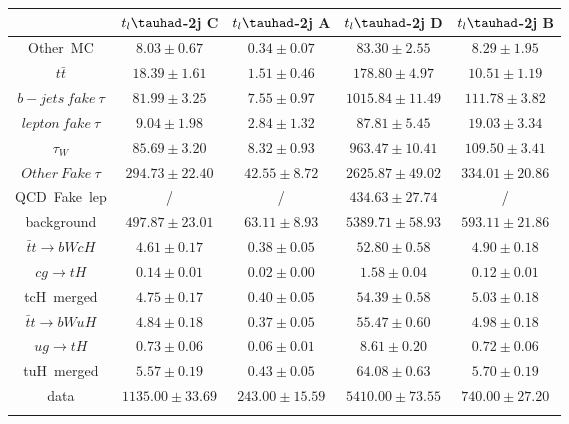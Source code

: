 \centering
\begin{tabular}{ccccc} \toprule\toprule
 & $t_{l}\tauhad$-2j C & $t_{l}\tauhad$-2j A & $t_{l}\tauhad$-2j D & $t_{l}\tauhad$-2j B\\\midrule
\hspace{3mm}Other~MC & $8.03\pm0.67$ & $0.34\pm0.07$ & $83.30\pm2.55$ & $8.29\pm1.95$\\
\hspace{3mm}$t\bar{t}$ & $18.39\pm1.61$ & $1.51\pm0.46$ & $178.80\pm4.97$ & $10.51\pm1.19$\\
\hspace{3mm}$b-jets~fake~\tau$ & $81.99\pm3.25$ & $7.55\pm0.97$ & $1015.84\pm11.49$ & $111.78\pm3.82$\\
\hspace{3mm}$lepton~fake~\tau$ & $9.04\pm1.98$ & $2.84\pm1.32$ & $87.81\pm5.45$ & $19.03\pm3.34$\\
\hspace{3mm}$\tau_{W}$ & $85.69\pm3.20$ & $8.32\pm0.93$ & $963.47\pm10.41$ & $109.50\pm3.41$\\
\hspace{3mm}$Other~Fake~\tau$ & $294.73\pm22.40$ & $42.55\pm8.72$ & $2625.87\pm49.02$ & $334.01\pm20.86$\\
\hspace{3mm}QCD~Fake~lep &  / &  / & $434.63\pm27.74$ &  /\\
background & $497.87\pm23.01$ & $63.11\pm8.93$ & $5389.71\pm58.93$ & $593.11\pm21.86$\\\midrule
\hspace{3mm}$\bar{t}t\to bWcH$ & $4.61\pm0.17$ & $0.38\pm0.05$ & $52.80\pm0.58$ & $4.90\pm0.18$\\
\hspace{3mm}$cg\to tH$ & $0.14\pm0.01$ & $0.02\pm0.00$ & $1.58\pm0.04$ & $0.12\pm0.01$\\
tcH~merged & $4.75\pm0.17$ & $0.40\pm0.05$ & $54.39\pm0.58$ & $5.03\pm0.18$\\
\hspace{3mm}$\bar{t}t\to bWuH$ & $4.84\pm0.18$ & $0.37\pm0.05$ & $55.47\pm0.60$ & $4.98\pm0.18$\\
\hspace{3mm}$ug\to tH$ & $0.73\pm0.06$ & $0.06\pm0.01$ & $8.61\pm0.20$ & $0.72\pm0.06$\\
tuH~merged & $5.57\pm0.19$ & $0.43\pm0.05$ & $64.08\pm0.63$ & $5.70\pm0.19$\\\midrule
data & $1135.00\pm33.69$ & $243.00\pm15.59$ & $5410.00\pm73.55$ & $740.00\pm27.20$\\
\bottomrule\bottomrule\\
\end{tabular}
